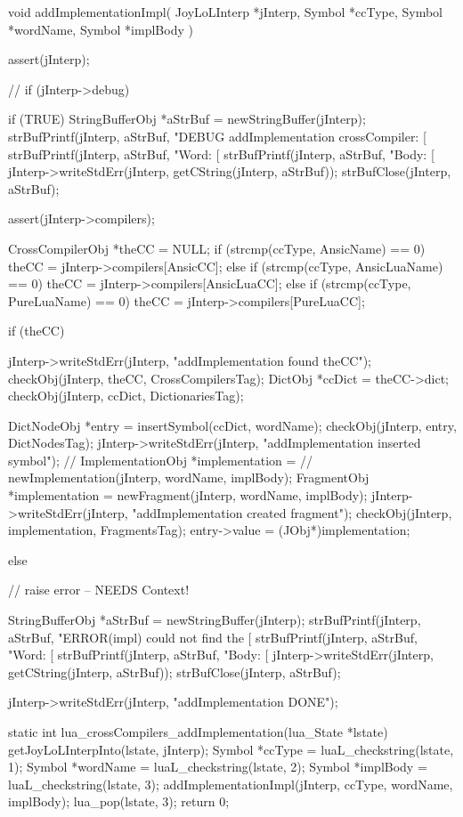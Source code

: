 \startCCode
void addImplementationImpl(
  JoyLoLInterp *jInterp,
  Symbol       *ccType,
  Symbol       *wordName,
  Symbol       *implBody
) {
  assert(jInterp);
  
//  if (jInterp->debug) {
  if (TRUE) {
    StringBufferObj *aStrBuf = newStringBuffer(jInterp);
    strBufPrintf(jInterp, aStrBuf, 
      "DEBUG addImplementation crossCompiler: [%
    strBufPrintf(jInterp, aStrBuf, "Word: [%
    strBufPrintf(jInterp, aStrBuf, "Body: [%
    jInterp->writeStdErr(jInterp, getCString(jInterp, aStrBuf));
    strBufClose(jInterp, aStrBuf);
  }
  
  assert(jInterp->compilers);

  CrossCompilerObj *theCC = NULL;
  if (strcmp(ccType, AnsicName) == 0) {
    theCC = jInterp->compilers[AnsicCC];
  } else if (strcmp(ccType, AnsicLuaName) == 0) {
    theCC = jInterp->compilers[AnsicLuaCC];
  } else if (strcmp(ccType, PureLuaName) == 0) {
    theCC = jInterp->compilers[PureLuaCC];
  }
  
  if (theCC) {
    jInterp->writeStdErr(jInterp, "addImplementation found theCC\n");
    checkObj(jInterp, theCC, CrossCompilersTag);
    DictObj *ccDict = theCC->dict;
    checkObj(jInterp, ccDict, DictionariesTag);
    
    DictNodeObj *entry    = insertSymbol(ccDict, wordName);
    checkObj(jInterp, entry, DictNodesTag);
    jInterp->writeStdErr(jInterp, "addImplementation inserted symbol\n");
//    ImplementationObj *implementation =
//      newImplementation(jInterp, wordName, implBody);
    FragmentObj *implementation =
      newFragment(jInterp, wordName, implBody);
    jInterp->writeStdErr(jInterp, "addImplementation created fragment\n");
    checkObj(jInterp, implementation, FragmentsTag);
    entry->value = (JObj*)implementation;
  } else {
    // raise error -- NEEDS Context!
    
    StringBufferObj *aStrBuf = newStringBuffer(jInterp);
    strBufPrintf(jInterp, aStrBuf, 
      "ERROR(impl) could not find the [%
    strBufPrintf(jInterp, aStrBuf, "Word: [%
    strBufPrintf(jInterp, aStrBuf, "Body: [%
    jInterp->writeStdErr(jInterp, getCString(jInterp, aStrBuf));
    strBufClose(jInterp, aStrBuf);
  }
  jInterp->writeStdErr(jInterp, "addImplementation DONE\n");
}

static int lua_crossCompilers_addImplementation(lua_State *lstate) {
  getJoyLoLInterpInto(lstate, jInterp);
  Symbol *ccType   = luaL_checkstring(lstate, 1);
  Symbol *wordName = luaL_checkstring(lstate, 2);
  Symbol *implBody = luaL_checkstring(lstate, 3);
  addImplementationImpl(jInterp, ccType, wordName, implBody);
  lua_pop(lstate, 3);
  return 0;
}
\stopCCode
\stopTestSuite

}
